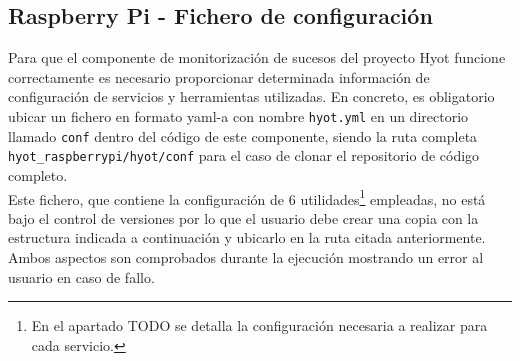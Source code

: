 \documentclass[12pt,a4paper, twoside]{report}
\begin{document}
	\subsection{Raspberry Pi - Fichero de configuración}
	
	Para que el componente de monitorización de sucesos del proyecto Hyot funcione correctamente es necesario proporcionar determinada información 	de configuración de servicios y herramientas utilizadas. En concreto, es obligatorio ubicar un fichero en formato \gls{yaml-a} con nombre \texttt{hyot.yml} en un directorio llamado \texttt{conf} dentro del código de este componente, siendo la ruta completa \texttt{hyot\_raspberrypi/hyot/conf} para el caso de clonar el repositorio de código completo. \\

	Este fichero, que contiene la configuración de 6 utilidades\footnote{En el apartado TODO se detalla la configuración necesaria a realizar para cada servicio.} empleadas, no está bajo el control de versiones por lo que el usuario debe crear una copia con la estructura indicada a continuación y ubicarlo en la ruta citada anteriormente. Ambos aspectos son comprobados durante la ejecución mostrando un error al usuario en caso de fallo. \\
\end{document}
